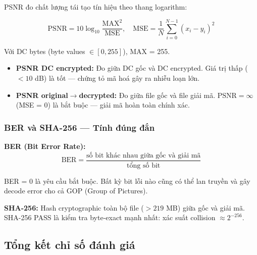 PSNR đo chất lượng tái tạo tín hiệu theo thang logarithm:

\begin{equation}
\text{PSNR} = 10 \log_{10} \frac{\text{MAX}^2}{\text{MSE}}, \quad
\text{MSE} = \frac{1}{N}\sum_{i=0}^{N-1}(x_i - y_i)^2
\end{equation}

Với DC bytes (byte values $\in [0, 255]$), MAX = 255.
\begin{itemize}
  \item \textbf{PSNR DC encrypted:} Đo giữa DC gốc và DC encrypted. Giá trị thấp
        ($< 10$ dB) là tốt --- chứng tỏ mã hoá gây ra nhiễu loạn lớn.
  \item \textbf{PSNR original$\to$decrypted:} Đo giữa file gốc và file giải mã.
        $\text{PSNR} = \infty$ (MSE = 0) là bắt buộc --- giải mã hoàn toàn chính xác.
\end{itemize}

\subsubsection{BER và SHA-256 --- Tính đúng đắn}

\textbf{BER (Bit Error Rate):}
\begin{equation}
\text{BER} = \frac{\text{số bit khác nhau giữa gốc và giải mã}}{\text{tổng số bit}}
\end{equation}

BER = 0 là yêu cầu bắt buộc. Bất kỳ bit lỗi nào cũng có thể lan truyền và gây
decode error cho cả GOP (Group of Pictures).

\textbf{SHA-256:} Hash cryptographic toàn bộ file ($> 219$ MB) giữa gốc và giải mã.
SHA-256 PASS là kiểm tra byte-exact mạnh nhất: xác suất collision $\approx 2^{-256}$.

\subsection{Tổng kết chỉ số đánh giá}

